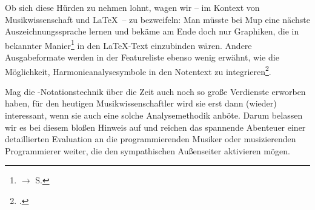 Ob sich diese Hürden zu nehmen lohnt, wagen wir -- im Kontext von
Musikwissenschaft und \LaTeX\ -- zu bezweifeln: Man müsste bei Mup eine nächste
Auszeichnungssprache lernen und bekäme am Ende doch nur Graphiken, die in
bekannter Manier\footnote{$\rightarrow$ S.\pageref{IncludeGraphics}} in den
\LaTeX-Text einzubinden wären. Andere Ausgabeformate werden in der Featureliste
ebenso wenig erwähnt, wie die Möglichkeit, Harmonieanalysesymbole in den
Notentext zu integrieren\footcite[vgl.][\nopage wp]{Arkka2017d}.

Mag die -Notationstechnik über die Zeit auch noch so große Verdienste
erworben haben, für den heutigen Musikwissenschaftler wird sie erst dann
(wieder) interessant, wenn sie auch eine solche Analysemethodik anböte. Darum
belassen wir es bei diesem bloßen Hinweis auf  und reichen das
spannende Abenteuer einer detaillierten Evaluation an die programmierenden
Musiker oder musizierenden Programmierer weiter, die den sympathischen
Außenseiter aktivieren mögen.

%
